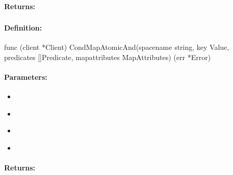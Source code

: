 \paragraph{Returns:}


\pagebreak
\subsubsection{}
\label{api:Go:CondMapAtomicAnd}


\paragraph{Definition:}
\begin{gocode}
func (client *Client) CondMapAtomicAnd(spacename string, key Value, predicates []Predicate, mapattributes MapAttributes) (err *Error)
\end{gocode}

\paragraph{Parameters:}
\begin{itemize}[noitemsep]
\item {}\\

\item {}\\

\item {}\\

\item {}\\

\end{itemize}

\paragraph{Returns:}


\pagebreak
\subsubsection{}
\label{api:Go:GroupMapAtomicAnd}


